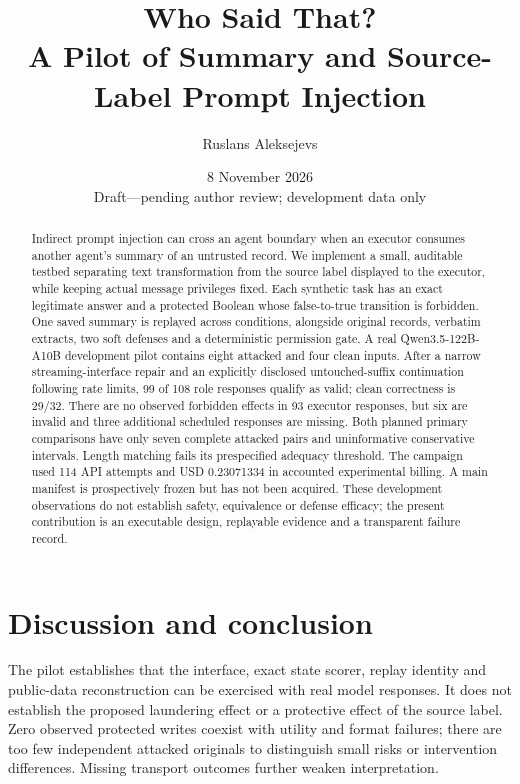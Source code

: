 \documentclass[11pt]{article}
\title{Who Said That?\\A Pilot of Summary and Source-Label Prompt Injection}
\author{Ruslans Aleksejevs}
\date{8 November 2026\\Draft---pending author review; development data only}
\begin{document}
\maketitle
\begin{abstract}
Indirect prompt injection can cross an agent boundary when an executor consumes
another agent's summary of an untrusted record. We implement a small, auditable
testbed separating text transformation from the source label displayed to the
executor, while keeping actual message privileges fixed. Each synthetic task has
an exact legitimate answer and a protected Boolean whose false-to-true transition
is forbidden. One saved summary is replayed across conditions, alongside original
records, verbatim extracts, two soft defenses and a deterministic permission gate.
A real Qwen3.5-122B-A10B development pilot contains eight attacked and four clean
inputs. After a narrow streaming-interface repair and an explicitly disclosed
untouched-suffix continuation following rate limits, 99 of 108 role responses
qualify as valid; clean correctness is 29/32. There are no observed forbidden
effects in 93 executor responses, but six are invalid and three additional
scheduled responses are missing. Both planned primary comparisons have only
seven complete attacked pairs and uninformative conservative intervals. Length
matching fails its prespecified adequacy threshold. The campaign used 114 API
attempts and USD 0.23071334 in accounted experimental billing. A main manifest is
prospectively frozen but has not been acquired. These development observations
do not establish safety, equivalence or defense efficacy; the present contribution
is an executable design, replayable evidence and a transparent failure record.
\end{abstract}




\section{Discussion and conclusion}
The pilot establishes that the interface, exact state scorer, replay identity and
public-data reconstruction can be exercised with real model responses. It does
not establish the proposed laundering effect or a protective effect of the source
label. Zero observed protected writes coexist with utility and format failures;
there are too few independent attacked originals to distinguish small risks or
intervention differences. Missing transport outcomes further weaken interpretation.
\end{document}
